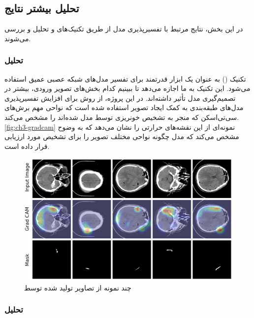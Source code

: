 \subsection{تحلیل بیشتر نتایج}

در این بخش، نتایج مرتبط با تفسیرپذیری مدل  از طریق تکنیک‌های  و  تحلیل و بررسی می‌شوند.

\subsubsection{تحلیل }

تکنیک 
()
 به عنوان یک ابزار قدرتمند برای تفسیر مدل‌های شبکه عصبی عمیق استفاده می‌شود. این تکنیک به ما اجازه می‌دهد تا ببینیم کدام بخش‌های تصویر ورودی، بیشتر در تصمیم‌گیری مدل تأثیر داشته‌اند. در این پروژه، از روش
  برای افزایش تفسیرپذیری مدل‌های طبقه‌بندی به کمک ایجاد تصویر استفاده شده است که نواحی مهم برش‌های سی‌تی‌اسکن که منجر به تشخیص خونریزی توسط مدل شده‌اند را مشخص می‌‌کند.  
  \autoref{fig:ch3-gradcam} 
  نمونه‌ای از این نقشه‌های حرارتی را نشان می‌دهد که به وضوح مشخص می‌کند که مدل چگونه نواحی مختلف تصویر را برای تشخیص  مورد ارزیابی قرار داده است.
\begin{figure}[h]
\centering
\includegraphics[width=1.0\linewidth]{Images/Chapter3/GradCam}
\caption{چند نمونه از تصاویر تولید شده توسط  }
\label{fig:ch3-gradcam}
\end{figure}

\subsubsection{تحلیل }

